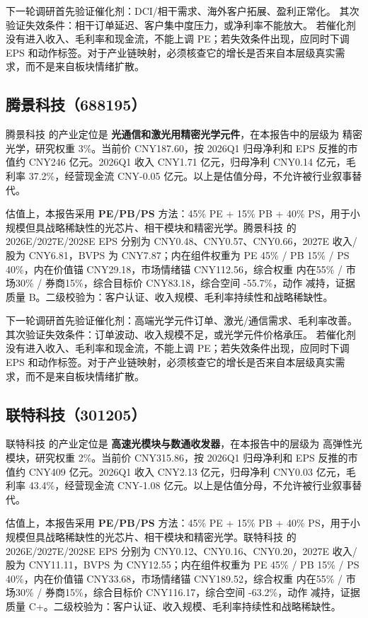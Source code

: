 下一轮调研首先验证催化剂：DCI/相干需求、海外客户拓展、盈利正常化。 其次验证失效条件：相干订单延迟、客户集中度压力，或净利率不能放大。 若催化剂没有进入收入、毛利率和现金流，不能上调 PE；若失效条件出现，应同时下调 EPS 和动作标签。对于产业链映射，必须核查它的增长是否来自本层级真实需求，而不是来自板块情绪扩散。


\subsection{腾景科技（688195）}
腾景科技 的产业定位是 \textbf{光通信和激光用精密光学元件}，在本报告中的层级为 精密光学，研究权重 3\%。当前价 CNY187.60，按 2026Q1 归母净利和 EPS 反推的市值约 CNY246 亿元。2026Q1 收入 CNY1.71 亿元，归母净利 CNY0.14 亿元，毛利率 37.2\%，经营现金流 CNY-0.05 亿元。以上是估值分母，不允许被行业叙事替代。

估值上，本报告采用 \textbf{PE/PB/PS} 方法：45\% PE + 15\% PB + 40\% PS，用于小规模但具战略稀缺性的光芯片、相干模块和精密光学。腾景科技 的 2026E/2027E/2028E EPS 分别为 CNY0.48、CNY0.57、CNY0.66，2027E 收入/股为 CNY6.81，BVPS 为 CNY7.87；内在组件权重为 PE 45\% / PB 15\% / PS 40\%，内在价值锚 CNY29.18，市场情绪锚 CNY112.56，综合权重 内在55\% / 市场30\% / 券商15\%，综合目标价 CNY83.18，综合空间 -55.7\%，动作 减持，证据质量 B。二级校验为：客户认证、收入规模、毛利率持续性和战略稀缺性。

下一轮调研首先验证催化剂：高端光学元件订单、激光/通信需求、毛利率改善。 其次验证失效条件：订单波动、收入规模不足，或光学元件价格承压。 若催化剂没有进入收入、毛利率和现金流，不能上调 PE；若失效条件出现，应同时下调 EPS 和动作标签。对于产业链映射，必须核查它的增长是否来自本层级真实需求，而不是来自板块情绪扩散。


\subsection{联特科技（301205）}
联特科技 的产业定位是 \textbf{高速光模块与数通收发器}，在本报告中的层级为 高弹性光模块，研究权重 2\%。当前价 CNY315.86，按 2026Q1 归母净利和 EPS 反推的市值约 CNY409 亿元。2026Q1 收入 CNY2.13 亿元，归母净利 CNY0.03 亿元，毛利率 43.4\%，经营现金流 CNY-1.08 亿元。以上是估值分母，不允许被行业叙事替代。

估值上，本报告采用 \textbf{PE/PB/PS} 方法：45\% PE + 15\% PB + 40\% PS，用于小规模但具战略稀缺性的光芯片、相干模块和精密光学。联特科技 的 2026E/2027E/2028E EPS 分别为 CNY0.12、CNY0.16、CNY0.20，2027E 收入/股为 CNY11.11，BVPS 为 CNY12.55；内在组件权重为 PE 45\% / PB 15\% / PS 40\%，内在价值锚 CNY33.68，市场情绪锚 CNY189.52，综合权重 内在55\% / 市场30\% / 券商15\%，综合目标价 CNY116.17，综合空间 -63.2\%，动作 减持，证据质量 C+。二级校验为：客户认证、收入规模、毛利率持续性和战略稀缺性。

